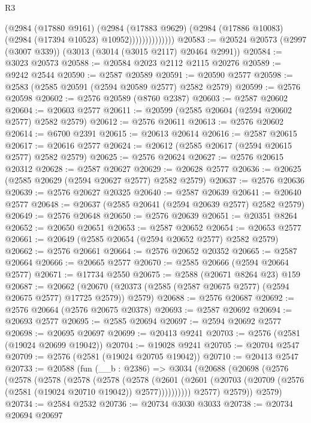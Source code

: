\begin{lexlean}{R3}
\begin{coremodule}
                        (@2984
                          (@17880 @9161)
                          (@2984
                            (@17883 @9629)
                            (@2984 (@17886 @10083) (@2984 (@17394 @10523) @10952))))))))))))))
@20583 := @20524 @20573 (@2997 (@3007 @339)) (@3013 (@3014 (@3015 @2117) @20464 @2991))
@20584 := @3023 @20573
@20588 := @20584 @2023 @2112 @2115 @20276
@20589 := @9242 @2544
@20590 := @2587 @20589
@20591 := @20590 @2577
@20598 := @2583 (@2585 @20591 (@2594 @20589 @2577) @2582 @2579)
@20599 := @2576 @20598
@20602 := @2576 @20589 (@8760 @2387)
@20603 := @2587 @20602
@20604 := @20603 @2577
@20611 := @20599 (@2585 @20604 (@2594 @20602 @2577) @2582 @2579)
@20612 := @2576 @20611
@20613 := @2576 @20602
@20614 := @6700 @2391
@20615 := @20613 @20614
@20616 := @2587 @20615
@20617 := @20616 @2577
@20624 := @20612 (@2585 @20617 (@2594 @20615 @2577) @2582 @2579)
@20625 := @2576 @20624
@20627 := @2576 @20615 @20312
@20628 := @2587 @20627
@20629 := @20628 @2577
@20636 := @20625 (@2585 @20629 (@2594 @20627 @2577) @2582 @2579)
@20637 := @2576 @20636
@20639 := @2576 @20627 @20325
@20640 := @2587 @20639
@20641 := @20640 @2577
@20648 := @20637 (@2585 @20641 (@2594 @20639 @2577) @2582 @2579)
@20649 := @2576 @20648
@20650 := @2576 @20639
@20651 := @20351 @8264
@20652 := @20650 @20651
@20653 := @2587 @20652
@20654 := @20653 @2577
@20661 := @20649 (@2585 @20654 (@2594 @20652 @2577) @2582 @2579)
@20662 := @2576 @20661
@20664 := @2576 @20652 @20352
@20665 := @2587 @20664
@20666 := @20665 @2577
@20670 := @2585 @20666 (@2594 @20664 @2577)
@20671 := @17734 @2550
@20675 := @2588 (@20671 @8264 @23) @159
@20687 := @20662
    (@20670 (@20373 (@2585 (@2587 @20675 @2577) (@2594 @20675 @2577) @17725 @2579)) @2579)
@20688 := @2576 @20687
@20692 := @2576 @20664 (@2576 @20675 @20378)
@20693 := @2587 @20692
@20694 := @20693 @2577
@20695 := @2585 @20694
@20697 := @2594 @20692 @2577
@20698 := @20695 @20697
@20699 := @20413 @9241
@20703 := @2576 (@2581 (@19024 @20699 @19042))
@20704 := @19028 @9241
@20705 := @20704 @2547
@20709 := @2576 (@2581 (@19024 @20705 @19042))
@20710 := @20413 @2547
@20733 := @20588
    (fun (__b : @2386) =>
    @3034
      (@20688
        (@20698
          (@2576
            (@2578
              (@2578
                (@2578
                  (@2578
                    (@2578
                      (@2601
                        (@2601 (@20703 (@20709 (@2576 (@2581 (@19024 @20710 @19042)) @2577))))))))))
            @2577)
          @2579))
      @2579)
@20734 := @2584 @2532
@20736 := @20734 @3030 @3033
@20738 := @20734 @20694 @20697

\end{coremodule}
\end{lexlean}
